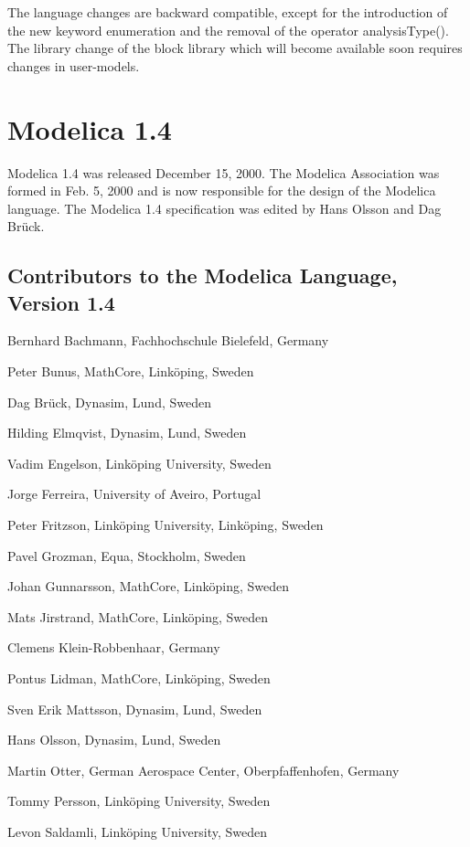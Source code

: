 \documentclass[10pt,a4paper]{report}
\def\doublelabel#1{\label{#1}\hypertarget{#1}{}}
\begin{document}
The language changes are backward compatible, except for the
introduction of the new keyword enumeration and the removal of the
operator analysisType(). The library change of the block library which
will become available soon requires changes in user-models.

\section{Modelica 1.4}\doublelabel{modelica-1-4}

Modelica 1.4 was released December 15, 2000. The Modelica Association
was formed in Feb. 5, 2000 and is now responsible for the design of the
Modelica language. The Modelica 1.4 specification was edited by Hans
Olsson and Dag Brück.

\subsection{Contributors to the Modelica Language, Version 1.4}\doublelabel{contributors-to-the-modelica-language-version-1-4}

Bernhard Bachmann, Fachhochschule Bielefeld, Germany

Peter Bunus, MathCore, Linköping, Sweden

Dag Brück, Dynasim, Lund, Sweden

Hilding Elmqvist, Dynasim, Lund, Sweden

Vadim Engelson, Linköping University, Sweden

Jorge Ferreira, University of Aveiro, Portugal

Peter Fritzson, Linköping University, Linköping, Sweden

Pavel Grozman, Equa, Stockholm, Sweden

Johan Gunnarsson, MathCore, Linköping, Sweden

Mats Jirstrand, MathCore, Linköping, Sweden

Clemens Klein-Robbenhaar, Germany

Pontus Lidman, MathCore, Linköping, Sweden

Sven Erik Mattsson, Dynasim, Lund, Sweden

Hans Olsson, Dynasim, Lund, Sweden

Martin Otter, German Aerospace Center, Oberpfaffenhofen, Germany

Tommy Persson, Linköping University, Sweden

Levon Saldamli, Linköping University, Sweden
\end{document}
